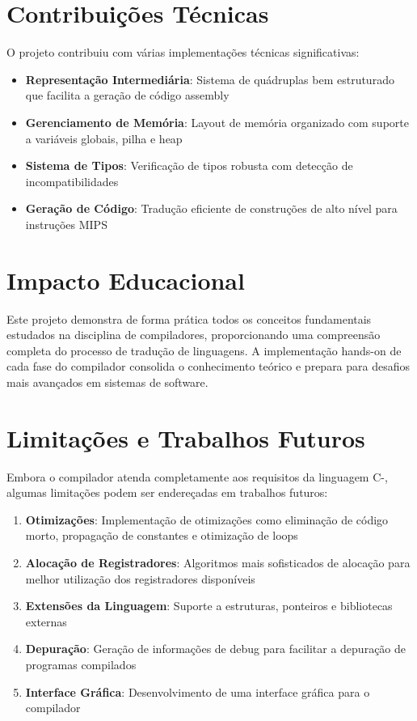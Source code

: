 \documentclass[
	12pt,				%
	oneside,
	a4paper,			%
	english,			%
	french,				%
	spanish,			%
	brazil,				%
	]{abntex2}
\begin{document}
\section{Contribuições Técnicas}

O projeto contribuiu com várias implementações técnicas significativas:

\begin{itemize}
    \item \textbf{Representação Intermediária}: Sistema de quádruplas bem estruturado que facilita a geração de código assembly
    \item \textbf{Gerenciamento de Memória}: Layout de memória organizado com suporte a variáveis globais, pilha e heap
    \item \textbf{Sistema de Tipos}: Verificação de tipos robusta com detecção de incompatibilidades
    \item \textbf{Geração de Código}: Tradução eficiente de construções de alto nível para instruções MIPS
\end{itemize}

\section{Impacto Educacional}

Este projeto demonstra de forma prática todos os conceitos fundamentais estudados na disciplina de compiladores, proporcionando uma compreensão completa do processo de tradução de linguagens. A implementação hands-on de cada fase do compilador consolida o conhecimento teórico e prepara para desafios mais avançados em sistemas de software.

\section{Limitações e Trabalhos Futuros}

Embora o compilador atenda completamente aos requisitos da linguagem C-, algumas limitações podem ser endereçadas em trabalhos futuros:

\begin{enumerate}
    \item \textbf{Otimizações}: Implementação de otimizações como eliminação de código morto, propagação de constantes e otimização de loops
    \item \textbf{Alocação de Registradores}: Algoritmos mais sofisticados de alocação para melhor utilização dos registradores disponíveis
    \item \textbf{Extensões da Linguagem}: Suporte a estruturas, ponteiros e bibliotecas externas
    \item \textbf{Depuração}: Geração de informações de debug para facilitar a depuração de programas compilados
    \item \textbf{Interface Gráfica}: Desenvolvimento de uma interface gráfica para o compilador
\end{enumerate}
\end{document}

